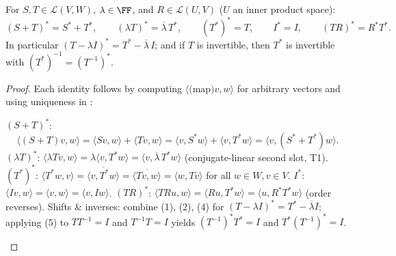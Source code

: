 \documentclass[10pt]{scrartcl}
\newcommand{\LL}{\mathcal L}\newcommand{\PP}{\mathcal P}\newcommand{\MM}{\mathcal M}
\begin{document}
\begin{proposition*}
  For $S,T\in\LL(V,W)$, $\lambda\in\FF$, and $R\in\LL(U,V)$ ($U$ an inner product space):
  \[
    (S+T)^*=S^*+T^*,\qquad (\lambda T)^*=\overline{\lambda}\,T^*,\qquad (T^*)^*=T,\qquad I^*=I,\qquad (TR)^*=R^*T^*.
  \]
  In particular $(T-\lambda I)^*=T^*-\overline{\lambda}\,I$; and if $T$ is invertible, then $T^*$ is invertible with $(T^*)^{-1}=(T^{-1})^*$.
\end{proposition*}
\begin{proof}
  Each identity follows by computing $\langle\text{(map)}v,w\rangle$ for arbitrary vectors and using uniqueness in :
  \begin{steps}
    \ii $(S+T)^*$:
    \[ \langle(S+T)v,w\rangle = \langle Sv,w\rangle+\langle Tv,w\rangle = \langle v,S^*w\rangle+\langle v,T^*w\rangle = \langle v,(S^*+T^*)w\rangle. \]
    \ii $(\lambda T)^*$: $\langle\lambda Tv,w\rangle = \lambda\langle v,T^*w\rangle = \langle v,\overline{\lambda}\,T^*w\rangle$ (conjugate-linear second slot, T1).
    \ii $(T^*)^*$: $\langle T^*w,v\rangle = \overline{\langle v,T^*w\rangle} = \overline{\langle Tv,w\rangle} = \langle w,Tv\rangle$ for all $w\in W,v\in V$.
    \ii $I^*$: $\langle Iv,w\rangle = \langle v,w\rangle = \langle v,Iw\rangle$.
    \ii $(TR)^*$: $\langle TRu,w\rangle = \langle Ru,T^*w\rangle = \langle u,R^*T^*w\rangle$ (order reverses).
    \ii Shifts \& inverses: combine (1), (2), (4) for $(T-\lambda I)^*=T^*-\overline{\lambda}I$; applying (5) to $TT^{-1}=I$ and $T^{-1}T=I$ yields $(T^{-1})^*T^*=I$ and $T^*(T^{-1})^*=I$.
  \end{steps}
\end{proof}
\end{document}
